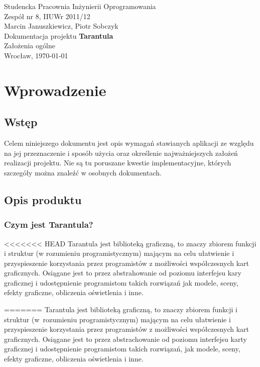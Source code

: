 \documentclass[11pt,leqno]{article}
\begin{document}
\begin{center}
\thispagestyle{empty}
{\Large Studencka Pracownia Inżynierii Oprogramowania}\\[0.5cm]
{\Large Zespół nr 8, IIUWr 2011/12}\\[2.5cm]

{\large Marcin Januszkiewicz, Piotr Sobczyk}\\[0.5cm]
{\huge Dokumentacja projektu \textbf{Tarantula}}\\[0.5cm]
{\huge Założenia ogólne}\\[0.5cm]
\vfill
{\large Wrocław, \today}
\end{center}
\newpage
\tableofcontents

\newpage


\newpage
\section{Wprowadzenie}

\subsection{Wstęp}
\noindent
Celem niniejszego dokumentu jest opis wymagań stawianych aplikacji ze względu na jej przeznaczenie i 
sposób użycia oraz określenie najważniejszych założeń realizacji projektu. 
Nie są tu poruszane kwestie implementacyjne, których szczegóły można znaleźć w osobnych dokumentach.

\subsection{Opis produktu}

\subsubsection{Czym jest Tarantula?}
\noindent
<<<<<<< HEAD
Tarantula jest biblioteką graficzną, to znaczy zbiorem funkcji i struktur (w rozumieniu programistycznym) mającym 
na celu ułatwienie i przyspieszenie korzystania przez programistów z możliwości współczesnych kart graficznych. 
Osiągane jest to przez abstrahowanie od poziomu interfejsu kary graficznej i udostępnienie programistom takich rozwiązań jak modele, sceny, efekty graficzne, obliczenia oświetlenia i inne.

=======
Tarantula jest biblioteką graficzną, to znaczy zbiorem funkcji i struktur (w~rozumieniu programistycznym) mającym 
na celu ułatwienie i przyspieszenie korzystania przez programistów z możliwości współczesnych kart graficznych. Osiągane jest to przez abstrachowanie od poziomu interfejsu karty graficznej i udostępnienie programistom takich rozwiązań, jak modele, sceny, efekty graficzne, obliczenia oświetlenia i inne.
\end{document}
